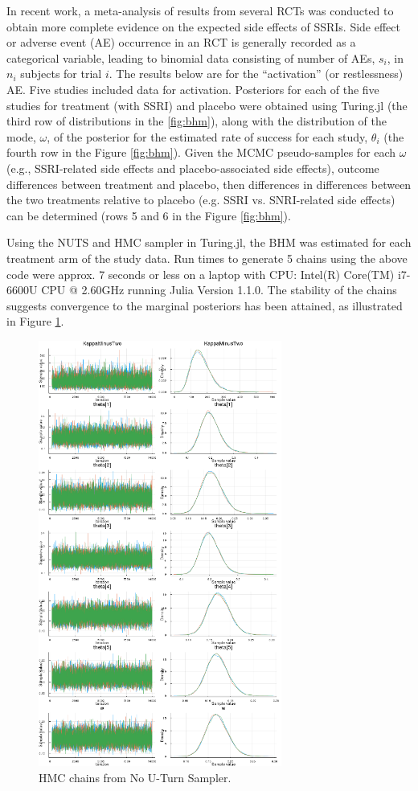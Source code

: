 \documentclass{juliacon}
\begin{document}
In recent work,\cite{Mills2019b} a meta-analysis of results from several RCTs was conducted to obtain more complete evidence on the expected side effects of SSRIs.  Side effect or adverse event (AE) occurrence in an RCT is generally recorded as a categorical variable, leading to binomial data consisting of number of AEs, $s_i$, in $n_i$ subjects for trial $i$. The results below are for the  “activation” (or restlessness) AE.  Five studies included data for activation.  Posteriors for each of the five studies for treatment (with SSRI) and placebo were obtained using Turing.jl (the third row of distributions in the \ref{fig:bhm}), along with the distribution of the mode, $\omega$, of the posterior for the estimated rate of success for each study, $\theta_i$ (the fourth row in the Figure \ref{fig:bhm}).  Given the MCMC pseudo-samples for each $\omega$ (e.g., SSRI-related side effects and placebo-associated side effects), outcome differences between treatment and placebo, then differences in differences between the two treatments relative to placebo (e.g. SSRI vs. SNRI-related side effects) can be determined (rows 5 and 6 in the Figure \ref{fig:bhm}).
\vskip 6pt

Using the NUTS and HMC sampler in Turing.jl, the BHM was estimated for each treatment arm of the study data. Run times to generate 5 chains using the above code were approx. 7 seconds or less on a laptop with CPU: Intel(R) Core(TM) i7-6600U CPU @ 2.60GHz running Julia Version 1.1.0. The stability of the chains suggests convergence to the marginal posteriors has been attained, as illustrated in Figure \ref{fig:chains}.
\begin{figure}[t]
	\centerline{\includegraphics[width=8cm]{mc_chains.png}}
	\caption{HMC chains from No U-Turn Sampler.}
	\label{fig:chains}
	\end{figure}
\end{document}
